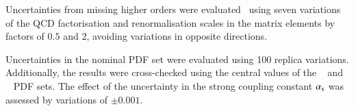 Uncertainties from missing higher orders were
evaluated~\cite{Bothmann:2016nao} using seven variations of the QCD
factorisation and renormalisation scales in the matrix elements by
factors of \(0.5\) and \(2\), avoiding variations in opposite directions.

Uncertainties in the nominal PDF set were evaluated using 100 replica
variations. Additionally, the results were cross-checked using the
central values of the \CT[14nnlo]~\cite{Dulat:2015mca} and
\MMHT[nnlo]~\cite{Harland-Lang:2014zoa} PDF sets. The effect of the uncertainty
in the strong coupling constant \(\alpha_{\text{s}}\) was assessed by variations of \(\pm 0.001\).




